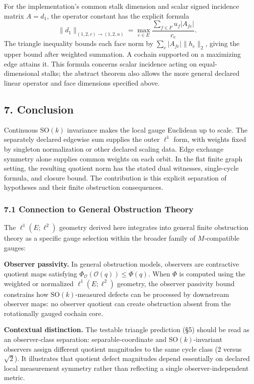 \documentclass[
  11pt,
]{article}
\begin{document}
For the implementation's common stalk dimension and scalar signed
incidence matrix \(A=d_1\), the operator constant has the explicit
formula \[
\|d_1\|_{(1,2,c)\to(1,2,u)}
=\max_{e\in E}\frac{\sum_{f\in F}u_f|A_{fe}|}{c_e}.
\] The triangle inequality bounds each face norm by
\(\sum_e|A_{fe}|\|h_e\|_2\), giving the upper bound after weighted
summation. A cochain supported on a maximizing edge attains it. This
formula concerns scalar incidence acting on equal-dimensional stalks;
the abstract theorem also allows the more general declared linear
operator and face dimensions specified above.

\subsection{7. Conclusion}\label{conclusion}

Continuous \(\mathrm{SO}(k)\) invariance makes the local gauge Euclidean
up to scale. The separately declared edgewise sum supplies the outer
\(\ell^1\) form, with weights fixed by singleton normalization or other
declared scaling data. Edge exchange symmetry alone supplies common
weights on each orbit. In the flat finite graph setting, the resulting
quotient norm has the stated dual witnesses, single-cycle formula, and
closure bound. The contribution is this explicit separation of
hypotheses and their finite obstruction consequences.

\subsubsection{7.1 Connection to General Obstruction
Theory}\label{connection-to-general-obstruction-theory}

The \(\ell^1(E; \ell^2)\) geometry derived here integrates into general
finite obstruction theory as a specific gauge selection within the
broader family of \(M\)-compatible gauges:

\textbf{Observer passivity.} In general obstruction models, observers
are contractive quotient maps satisfying
\(\Phi_{\mathcal O}(\mathcal O(q)) \le \Phi(q)\). When \(\Phi\) is
computed using the weighted or normalized \(\ell^1(E; \ell^2)\)
geometry, the observer passivity bound constrains how
\(\mathrm{SO}(k)\)-measured defects can be processed by downstream
observer maps: no observer quotient can create obstruction absent from
the rotationally gauged cochain core.

\textbf{Contextual distinction.} The testable triangle prediction (§5)
should be read as an observer-class separation: separable-coordinate and
\(\mathrm{SO}(k)\)-invariant observers assign different quotient
magnitudes to the same cycle class (\(2\) versus \(\sqrt{2}\)). It
illustrates that quotient defect magnitudes depend essentially on
declared local measurement symmetry rather than reflecting a single
observer-independent metric.
\end{document}

